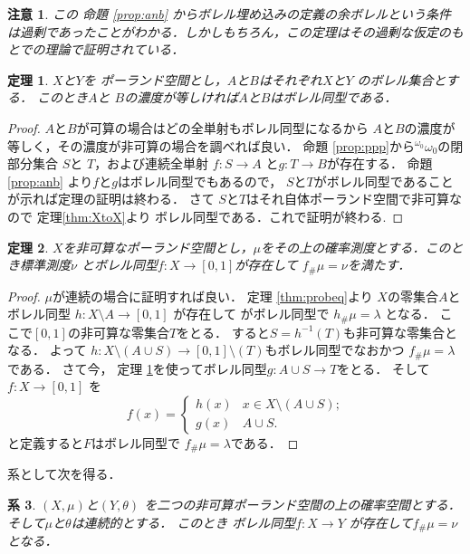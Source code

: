 \documentclass[leqno, 12pt]{jsarticle}
\newtheorem{thm}{定理}
\newtheorem{cor}[thm]{系}
\newtheorem*{rmk}{注意}
\newcommand{\myomega}{\omega_{0}}
\newcommand{\mybaire}{{}^{\myomega}\myomega}
\newcommand{\myppp}[2]{#1_{\#}#2}
\begin{document}
\begin{rmk}
この
命題
\ref{prop:anb}
からボレル埋め込みの定義の余ボレルという条件は過剰であったことがわかる．しかしもちろん，この定理はその過剰な仮定のもとでの理論で証明されている．
\end{rmk}


\begin{thm}\label{thm:mainbbbb}
$X$と$Y$を
ポーランド空間とし，$A$と$B$はそれぞれ$X$と$Y$
のボレル集合とする．
このとき$A$と
$B$の濃度が等しければ$A$と$B$はボレル同型である．
\end{thm}
\begin{proof}
$A$と$B$が可算の場合はどの全単射もボレル同型になるから
$A$と$B$の濃度が等しく，その濃度が非可算の場合を調べれば良い．
命題
\ref{prop:ppp}から$\mybaire$の閉部分集合
$S$と
$T$，および連続全単射
$f\colon S\to A$
と$g\colon T\to B$が存在する．
命題 \ref{prop:anb}
より$f$と$g$はボレル同型でもあるので，
$S$と$T$がボレル同型であることが示れば定理の証明は終わる．
さて
$S$と$T$はそれ自体ポーランド空間で非可算なので
定理\ref{thm:XtoX}より
ボレル同型である．これで証明が終わる.
\end{proof}


\begin{thm}\label{thm:maineqppp}
$X$を非可算なポーランド空間とし，$\mu$をその上の確率測度とする．このとき標準測度$\nu$
とボレル同型$f\colon X\to [0, 1]$が存在して
$\myppp{f}{\mu}=\nu$を満たす．
\end{thm}
\begin{proof}
$\mu$が連続の場合に証明すれば良い．
定理 
\ref{thm:probeq}より
$X$の零集合$A$とボレル同型
$h\colon X\setminus A\to [0, 1]$
が存在して
がボレル同型で
$\myppp{h}{\mu}=\lambda$
となる．
ここで$[0, 1]$の非可算な零集合$T$をとる．
すると$S=h^{-1}(T)$も非可算な零集合となる．
よって
$h\colon X\setminus (A\cup S)\to 
[0, 1]\setminus (T)$もボレル同型でなおかつ
$\myppp{f}{\mu}=\lambda$である．
さて今，
定理
\ref{thm:mainbbbb}$ 
を使ってボレル同型
g\colon A\cup S\to T$をとる．
そして
$f\colon X\to [0, 1]$
を
\[
f(x)=
\begin{cases}
h(x) & \text{$x\in X\setminus (A\cup S)$;}\\
g(x) & \text{$A\cup S$.}
\end{cases}
\]
と定義すると$F$はボレル同型で
$\myppp{f}{\mu}=\lambda$である．
\end{proof}

系として次を得る．

\begin{cor}\label{cor:probeqX}
$(X, \mu)$と$(Y, \theta)$
を二つの非可算ポーランド空間の上の確率空間とする．
そして$\mu$と$\theta$は連続的とする．
このとき
ボレル同型$f\colon X\to Y$
が存在して$\myppp{f}{\mu}=\nu$
となる．
\end{cor}
\end{document}

